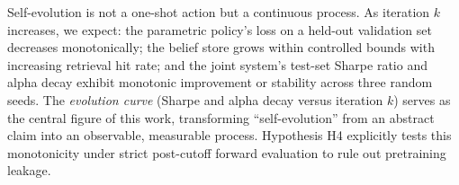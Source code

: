 Self-evolution is not a one-shot action but a continuous process. As iteration $k$ increases, we expect: the parametric policy's loss on a held-out validation set decreases monotonically; the belief store grows within controlled bounds with increasing retrieval hit rate; and the joint system's test-set Sharpe ratio and alpha decay exhibit monotonic improvement or stability across three random seeds. The \emph{evolution curve} (Sharpe and alpha decay versus iteration $k$) serves as the central figure of this work, transforming ``self-evolution'' from an abstract claim into an observable, measurable process. Hypothesis H4 explicitly tests this monotonicity under strict post-cutoff forward evaluation to rule out pretraining leakage.
